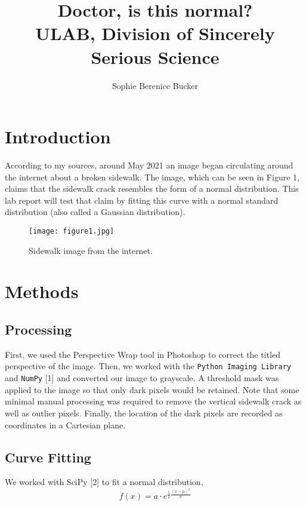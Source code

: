 \documentclass{article}
\begin{document}
\title{Doctor, is this normal? \\[1ex] \large ULAB, Division of Sincerely Serious Science}

\author{Sophie Berenice Bucker}
\maketitle


\section{Introduction}
According to my sources, around May 2021 an image began circulating around the internet about a broken
sidewalk. The image, which can be seen in Figure 1, claims that the sidewalk crack resembles the form
of a normal distribution. This lab report will test that claim by fitting this curve with a normal standard
distribution (also called a Gaussian distribution).

\begin{figure}[h]
    \centering
    \texttt{[image: figure1.jpg]}
    \caption{Sidewalk image from the internet.}
     \label{fig:crack}
\end{figure}

\section{Methods}

\subsection{Processing}
First, we used the Perspective Wrap tool in Photoshop to correct the titled perspective of the image. Then,
we worked with the \texttt{Python Imaging Library} and \texttt{NumPy} [1] and converted our image to grayscale.
A threshold mask was applied to the image so that only dark pixels would be retained. Note that some
minimal manual processing was required to remove the vertical sidewalk crack as well as outlier pixels.
Finally, the location of the dark pixels are recorded as coordinates in a Cartesian plane.

\subsection{Curve Fitting}
We worked with SciPy [2] to fit a normal distribution,
\begin{equation}
    f(x) = a \cdot e^{\frac{1}{2}\frac{(x - \mu)^2}{\sigma}}
\end{equation}
\end{document}
